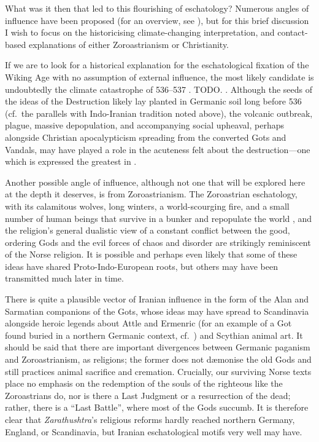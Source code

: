 What was it then that led to this flourishing of eschatology?  Numerous angles of influence have been proposed (for an overview, see \textcite[7--19]{Hultgård2022}), but for this brief discussion I wish to focus on the historicising climate-changing interpretation, and contact-based explanations of either Zoroastrianism or Christianity.

If we are to look for a historical explanation for the eschatological fixation of the Wiking Age with no assumption of external influence, the most likely candidate is undoubtedly the climate catastrophe of 536--537 \ce.  TODO. \textcite{Gräslund2008}.
Although the seeds of the ideas of the Destruction likely lay planted in Germanic soil long before 536 (cf.~the parallels with Indo-Iranian tradition noted above), the volcanic outbreak, plague, massive depopulation, and accompanying social upheaval, perhaps alongside Christian apocalypticism spreading from the converted Gots and Vandals, may have played a role in the acuteness felt about the destruction---one which is expressed the greatest in \Voluspa.

Another possible angle of influence, although not one that will be explored here at the depth it deserves, is from Zoroastrianism.  The Zoroastrian eschatology, with its calamitous wolves, long winters, a world-scourging fire, and a small number of human beings that survive in a bunker and repopulate the world \parencites{Hultgård2007}[29--30,162--163,165,170]{Skjaervo2011}, and the religion’s general dualistic view of a constant conflict between the good, ordering Gods and the evil forces of chaos and disorder \parencite[8--11]{Skjaervo2011} are strikingly reminiscent of the Norse religion.  It is possible and perhaps even likely that some of these ideas have shared Proto-Indo-European roots, but others may have been transmitted much later in time.

There is quite a plausible vector of Iranian influence in the form of the Alan and Sarmatian companions of the Gots, whose ideas may have spread to Scandinavia alongside heroic legends about Attle and Ermenric (for an example of a Got found buried in a northern Germanic context, cf.~\cite{Myburgh2026}) and Scythian animal art.  It should be said that there are important divergences between Germanic paganism and Zoroastrianism, as religions; the former does not dæmonise the old Gods and still practices animal sacrifice and cremation.  Crucially, our surviving Norse texts place no emphasis on the redemption of the souls of the righteous like the Zoroastrians do, nor is there a Last Judgment or a resurrection of the dead; rather, there is a “Last Battle”, where most of the Gods succumb.  It is therefore clear that \emph{Zarathushtra}’s religious reforms hardly reached northern Germany, England, or Scandinavia, but Iranian eschatological motifs very well may have.

